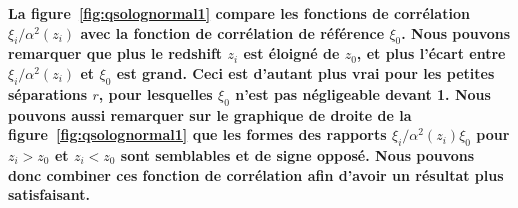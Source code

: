 \documentclass[11pt, twoside, a4paper, openright]{report}
\begin{document}
\textbf{
La figure~\ref{fig:qsolognormal1} compare les fonctions de corrélation $\xi_i / \alpha^2(z_i)$ avec la fonction de corrélation de référence $\xi_0$.
Nous pouvons remarquer que plus le redshift $z_i$ est éloigné de $z_0$, et plus l'écart entre $\xi_i / \alpha^2(z_i)$ et $\xi_0$ est grand.
Ceci est d'autant plus vrai pour les petites séparations $r$, pour lesquelles $\xi_0$ n'est pas négligeable devant 1. %
Nous pouvons aussi remarquer sur le graphique de droite de la figure~\ref{fig:qsolognormal1} que les formes des rapports $\xi_i / \alpha^2(z_i)\xi_0$ pour $z_i > z_0$ et $z_i < z_0$ sont semblables et de signe opposé. Nous pouvons donc combiner ces fonction de corrélation afin d'avoir un résultat plus satisfaisant.}
\end{document}
